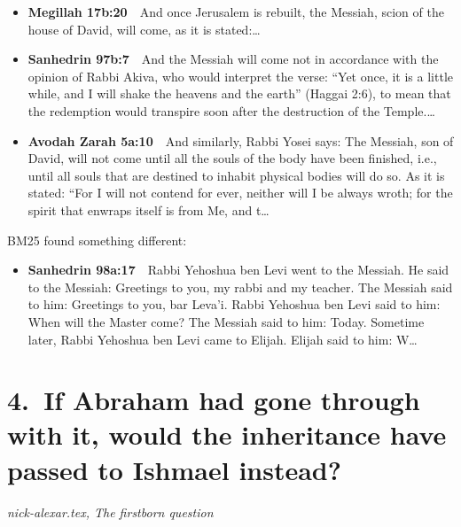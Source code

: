 \documentclass[11pt,a4paper]{article}
\begin{document}
\begin{itemize}[leftmargin=1.2em,itemsep=3pt]
\item {\color{ref}\textbf{Megillah 17b:20}}\ \ And once Jerusalem is rebuilt, the Messiah, scion of the house of David, will come, as it is stated:\ldots
\item {\color{ref}\textbf{Sanhedrin 97b:7}}\ \ And the Messiah will come not in accordance with the opinion of Rabbi Akiva, who would interpret the verse: “Yet once, it is a little while, and I will shake the heavens and the earth” (Haggai 2:6), to mean that the redemption would transpire soon after the destruction of the Temple.\ldots
\item {\color{ref}\textbf{Avodah Zarah 5a:10}}\ \ And similarly, Rabbi Yosei says: The Messiah, son of David, will not come until all the souls of the body have been finished, i.e., until all souls that are destined to inhabit physical bodies will do so. As it is stated: “For I will not contend for ever, neither will I be always wroth; for the spirit that enwraps itself is from Me, and t\ldots
\end{itemize}
{\color{quiet}\small BM25 found something different:}
\begin{itemize}[leftmargin=1.2em]
\item {\color{ref}\textbf{Sanhedrin 98a:17}}\ \ Rabbi Yehoshua ben Levi went to the Messiah. He said to the Messiah: Greetings to you, my rabbi and my teacher. The Messiah said to him: Greetings to you, bar Leva’i. Rabbi Yehoshua ben Levi said to him: When will the Master come? The Messiah said to him: Today. Sometime later, Rabbi Yehoshua ben Levi came to Elijah. Elijah said to him: W\ldots
\end{itemize}

\section*{4.\ If Abraham had gone through with it, would the inheritance have passed to Ishmael instead?}
{\color{quiet}\small\textit{nick-alexar.tex, The firstborn question}}
\end{document}
